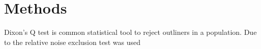 \chapter{Methods}

Dixon's Q test is common statistical tool to reject outliners in a population. Due to the relative noise exclusion test was used 